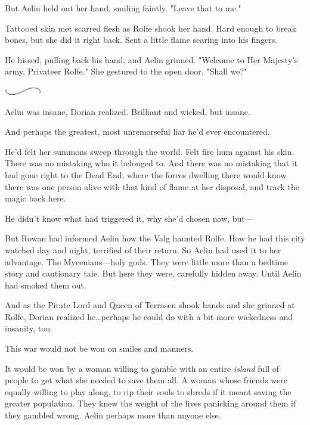 But Aelin held out her hand, smiling faintly.
"Leave that to me."

Tattooed skin met scarred flesh as Rolfe shook her hand.
Hard enough to break bones, but she did it right back.
Sent a little flame searing into his fingers.

He hissed, pulling back his hand, and Aelin grinned.
"Welcome to Her Majesty's army, Privateer Rolfe."
She gestured to the open door.
"Shall we?"

\begin{center}
	\includegraphics[width=0.65in,height=0.13in]{images/seperator}
\end{center}

Aelin was insane, Dorian realized.
Brilliant and wicked, but insane.

And perhaps the greatest, most unremorseful liar he'd ever encountered.

He'd felt her summons sweep through the world.
Felt fire hum against his skin.
There was no mistaking who it belonged to.
And there was no mistaking that it had gone right to the Dead End, where the forces dwelling there would know there was one person alive with that kind of flame at her disposal, and track the magic back here.

He didn't know what had triggered it, why she'd chosen now, but---

But Rowan had informed Aelin how the Valg haunted Rolfe.
How he had this city watched day and night, terrified of their return.
So Aelin had used it to her advantage.
The Mycenians---holy gods.
They were little more than a bedtime story and cautionary tale.
But here they were, carefully hidden away.
Until Aelin had smoked them out.

And as the Pirate Lord and Queen of Terrasen shook hands and she grinned at Rolfe, Dorian realized he\ldots perhaps he could do with a bit more wickedness and insanity, too.

This war would not be won on smiles and manners.

It would be won by a woman willing to gamble with an entire \emph{island} full of people to get what she needed to save them all.
A woman whose friends were equally willing to play along, to rip their souls to shreds if it meant saving the greater population.
They knew the weight of the lives panicking around them if they gambled wrong.
Aelin perhaps more than anyone else.

